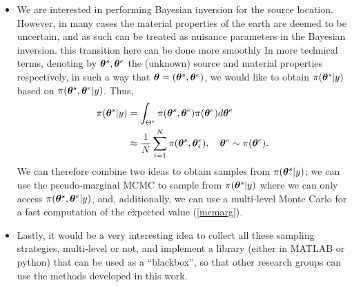 \begin{itemize}
	\item We are interested in performing Bayesian inversion for the source location. However, in many cases the material properties of the earth are deemed to be uncertain, and as such can be treated as nuisance parameters in the Bayesian inversion.\color{red} this transition here can be done more smoothly \color{black} In more technical terms,  denoting by $\bm{\theta}^s, \bm{\theta}^e$ the  (unknown) source and material properties respectively, in such a way that $\bm{\theta}=(\bm{\theta}^s,\bm{\theta}^e)$, we would like to obtain $\pi(\bm{\theta}^s|y)$ based on $\pi(\bm{\theta}^s,\bm{\theta}^e|y)$. Thus, \begin{align}
\pi(\bm{\theta}^s|y)&=\int_{\Theta^e}\pi(\bm{\theta}^s,\bm{\theta}^e)\pi(\bm{\theta}^e)d\bm{\theta}^e \label{marg}\\ &\approx\frac{1}{N}\sum^N_{i=1}\pi(\bm{\theta}^s,\bm{\theta}^e_i), \quad \bm{\theta}^e\sim \pi(\bm{\theta}^e).\label{mcmarg}
	\end{align} We can therefore combine two ideas to obtain samples from $\pi(\bm{\theta}^s|y)$; we can use the pseudo-marginal MCMC  \cite{andrieu2009pseudo} to sample from  $\pi(\bm{\theta}^s|y)$ where we can only access $\pi(\bm{\theta}^s,\bm{\theta}^e|y)$, and, additionally, we can use a  multi-level Monte Carlo for a fast computation of the expected value (\ref{mcmarg}).  
	\item Lastly, it would be a very interesting idea to collect all these sampling strategies, multi-level or not, and implement a library  (either in MATLAB or python) that can be used as a ``blackbox'', so that other research groups can use the methods developed in this work. \\
\end{itemize}

